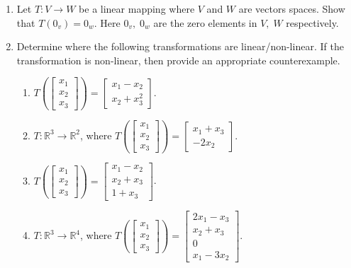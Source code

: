 \documentclass[12pt]{article}
\begin{document}
\begin{enumerate}


\item Let $T:V \rightarrow W$ be a linear mapping where $V$ and $W$ are vectors spaces.  Show that $T(0_{v}) = 0_{w}$.  Here $0_{v}, \; 0_{w}$ are the zero elements in $V, \; W$ respectively.  

\item Determine where the following transformations are linear/non-linear.  If the transformation is non-linear, then provide an appropriate counterexample.  
\begin{enumerate} 
 \item    $T\left(\begin{bmatrix} 
 x_1\\x_2\\x_3 \end{bmatrix} \right)=\begin{bmatrix} x_1-x_2\\x_2+x_3^2 \end{bmatrix} $.
   \item $T:\mathbb{R}^3\rightarrow\mathbb{R}^2$, where $T\left(\begin{bmatrix} x_1\\x_2\\x_3 \end{bmatrix} \right)=\begin{bmatrix} x_1+x_3\\-2x_2 \end{bmatrix} $.
 
 \item     $T\left(\begin{bmatrix} x_1\\x_2\\x_3 \end{bmatrix} \right)=\begin{bmatrix} x_1-x_2\\x_2+x_3\\1+x_3 \end{bmatrix} $.

   \item  $T:\mathbb{R}^3\rightarrow\mathbb{R}^4$, where $T\left(\begin{bmatrix} x_1\\x_2\\x_3 \end{bmatrix} \right)=\begin{bmatrix} 2x_1-x_3\\x_2+x_3\\0\\x_1-3x_2 \end{bmatrix} $.


\end{enumerate}
\end{enumerate}
\end{document}
